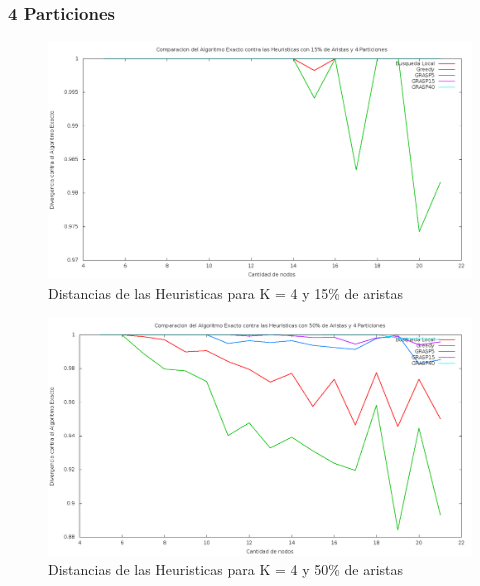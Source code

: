 \subsubsection{4 Particiones}

\begin{figure}[H]
\begin{center}
\includegraphics[scale=0.3]{finales/ComparacionesCon4Particiones15Aristas.png}
\caption{Distancias de las Heuristicas para K = 4 y 15\% de aristas}
\end{center}
\end{figure}

\begin{figure}[H]
\begin{center}
\includegraphics[scale=0.3]{finales/ComparacionesCon4Particiones50Aristas.png}
\caption{Distancias de las Heuristicas para K = 4 y 50\% de aristas}
\end{center}
\end{figure}

